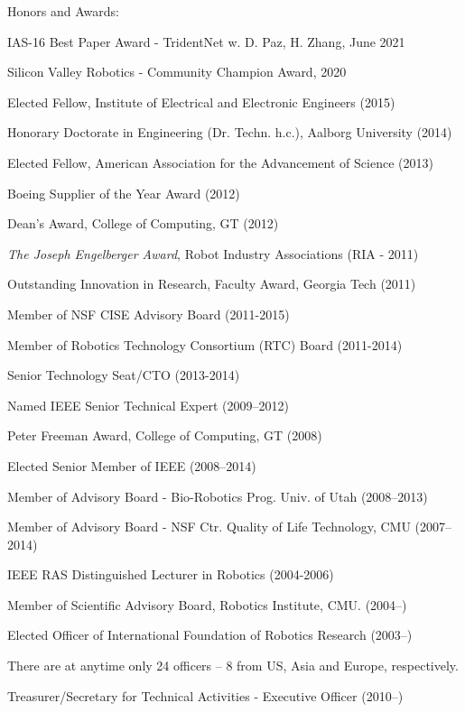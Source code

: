 \documentclass{article}
\newenvironment{sublist}{%
  \begin{list}{}{%
      \setlength{\itemsep}{0em}\setlength{\parsep}{0em}%
      \setlength{\topsep}{0em}\setlength{\parskip}{0em}%
    }%
}%
{ \end{list} }
\begin{document}
\begin{cv}
\begin{cvlist}{Honors and Awards:}
\item IAS-16 Best Paper Award - TridentNet w. D. Paz, H. Zhang, June 2021  
\item Silicon Valley Robotics - Community Champion Award, 2020
\item Elected Fellow, Institute of Electrical and Electronic Engineers (2015)
\item Honorary Doctorate in Engineering (Dr. Techn. h.c.), Aalborg University (2014)
\item Elected Fellow, American Association for the Advancement of Science (2013)
\item Boeing Supplier of the Year Award (2012)
\item Dean's Award, College of Computing, GT (2012)
\item {\em The Joseph Engelberger Award}, Robot Industry Associations (RIA - 2011)
\item Outstanding Innovation in Research, Faculty Award, Georgia Tech (2011)
\item Member of NSF CISE Advisory Board (2011-2015)
\item Member of Robotics Technology Consortium (RTC) Board (2011-2014)
  \begin{sublist}
  \item Senior Technology Seat/CTO (2013-2014)
  \end{sublist}
\item Named IEEE Senior Technical Expert (2009--2012)
\item Peter Freeman Award, College of Computing, GT (2008)
\item Elected Senior Member of IEEE (2008--2014)
\item Member of Advisory Board - Bio-Robotics Prog. Univ. of Utah (2008--2013)
\item Member of Advisory Board - NSF Ctr. Quality of Life Technology,
  CMU (2007--2014)
\item IEEE RAS Distinguished Lecturer in Robotics (2004-2006)
\item Member of Scientific Advisory Board, Robotics Institute, CMU.  (2004--)
\item Elected Officer of International Foundation of Robotics Research
  (2003--)
  \begin{sublist}
  \item There are at anytime only 24 officers -- 8 from US, Asia and Europe,
    respectively.
  \item Treasurer/Secretary for Technical Activities - Executive Officer (2010--)

\end{sublist}
\end{cvlist}
\end{cv}
\end{document}
